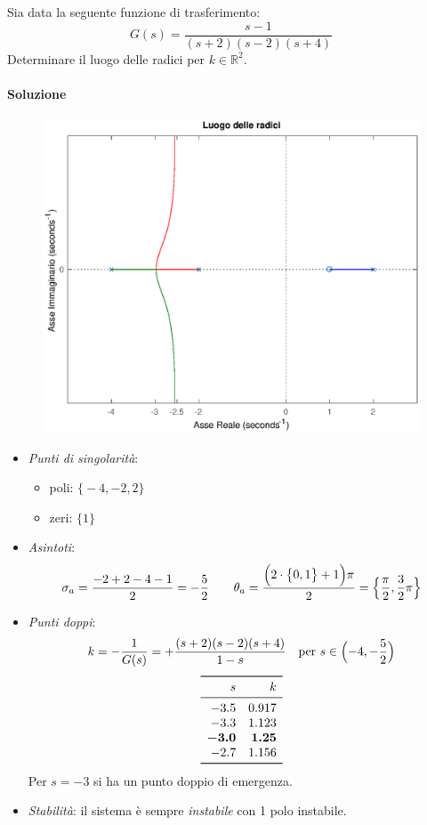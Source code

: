 \begin{esercizio}
Sia data la seguente funzione di trasferimento:
\[
	G(s) = \frac{s-1}{(s+2)(s-2)(s+4)}
\]
Determinare il luogo delle radici per \(k\in\mathbb{R}^2\).

\paragraph{Soluzione}

\begin{figure}[ht]
	\centering
	\includegraphics[scale=.6]{mod1/assets/rl_ex39}
\end{figure}

\begin{itemize}
	\item \emph{Punti di singolarità}:
		\begin{itemize}
			\item poli: \(\bigl\{ -4,-2,2 \bigr\}\) \\
			\item zeri: \(\bigl\{ 1 \bigr\}\)
		\end{itemize}
	\item \emph{Asintoti}:
		\[
			\sigma_a = \frac{-2+2-4-1}{2} = -\frac{5}{2} \qquad
			\theta_a = \frac{\Bigl(2\cdot \bigl\{0,1\bigr\} +1\Bigr)\pi}{2} = \Bigl\{ \frac{\pi}{2},\frac{3}{2}\pi \Bigr\}
		\]
	\item \emph{Punti doppi}:
		\[
			k = -\frac{1}{G(s)} = + \frac{(s+2)(s-2)(s+4)}{1-s} \quad
			\text{per } s \in \Bigl(-4,-\frac{5}{2}\Bigr)
		\]
		\[\begin{array}{rr}
			\toprule
			s 	  & k 		\\
			\midrule
			-3.5 	  & 0.917 	\\
			-3.3 	  & 1.123 	\\
			\bm{-3.0} & \bm{1.25} 	\\
			-2.7 	  & 1.156	\\
			\bottomrule
		\end{array}\]
		Per \(s=-3\) si ha un punto doppio di emergenza.
	\item \emph{Stabilità}: il sistema è sempre \emph{instabile} con 1 polo instabile.
\end{itemize}
\end{esercizio}

